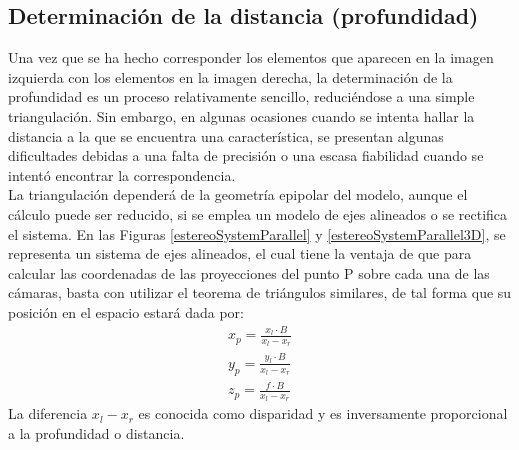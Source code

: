 \subsection{Determinación de la distancia (profundidad)}
Una vez que se ha hecho corresponder los elementos que aparecen en la imagen izquierda con los elementos en la imagen derecha, la determinación de la profundidad es un proceso relativamente sencillo, reduciéndose a una simple triangulación. Sin embargo, en algunas ocasiones cuando se intenta hallar la distancia a la que se encuentra una característica, se presentan algunas dificultades debidas a una falta de precisión o una escasa fiabilidad cuando se intentó encontrar la correspondencia.
\\
La triangulación dependerá de la geometría epipolar del modelo, aunque el cálculo puede ser reducido, si se emplea un modelo de ejes alineados o se rectifica el sistema.  En las Figuras \ref{estereoSystemParallel} y \ref{estereoSystemParallel3D}, se representa un sistema de ejes alineados, el cual tiene la ventaja de que para calcular las coordenadas de las proyecciones del punto P sobre cada una de las cámaras, basta con utilizar el teorema de triángulos similares, de tal forma que su posición en el espacio estará dada por: 
\begin{align}
x_{p} = \frac{x_{l}\cdot B}{x_{l} - x_{r}}\\
y_{p} = \frac{y_{l}\cdot B}{x_{l} - x_{r}}\\
z_{p} = \frac{f\cdot B}{x_{l} - x_{r}}
\end{align}
La diferencia $x_{l} - x_{r}$ es conocida como disparidad y es inversamente proporcional a la profundidad o distancia.
